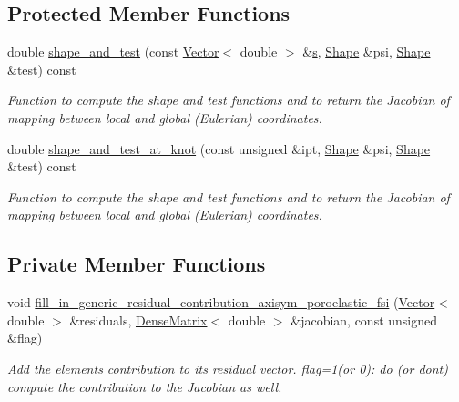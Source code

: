 \subsection*{Protected Member Functions}
\begin{DoxyCompactItemize}
\item 
double \hyperlink{classoomph_1_1LinearisedAxisymPoroelasticBJS__FSIElement_a7b0a7d3c7c5e8f98741ae725b4a03f04}{shape\+\_\+and\+\_\+test} (const \hyperlink{classoomph_1_1Vector}{Vector}$<$ double $>$ \&\hyperlink{cfortran_8h_ab7123126e4885ef647dd9c6e3807a21c}{s}, \hyperlink{classoomph_1_1Shape}{Shape} \&psi, \hyperlink{classoomph_1_1Shape}{Shape} \&test) const
\begin{DoxyCompactList}\small\item\em Function to compute the shape and test functions and to return the Jacobian of mapping between local and global (Eulerian) coordinates. \end{DoxyCompactList}\item 
double \hyperlink{classoomph_1_1LinearisedAxisymPoroelasticBJS__FSIElement_a9d3bcc9afdc79f09987164694d933b75}{shape\+\_\+and\+\_\+test\+\_\+at\+\_\+knot} (const unsigned \&ipt, \hyperlink{classoomph_1_1Shape}{Shape} \&psi, \hyperlink{classoomph_1_1Shape}{Shape} \&test) const
\begin{DoxyCompactList}\small\item\em Function to compute the shape and test functions and to return the Jacobian of mapping between local and global (Eulerian) coordinates. \end{DoxyCompactList}\end{DoxyCompactItemize}
\subsection*{Private Member Functions}
\begin{DoxyCompactItemize}
\item 
void \hyperlink{classoomph_1_1LinearisedAxisymPoroelasticBJS__FSIElement_a68c8de96b9f3034c9437e80036b2df1a}{fill\+\_\+in\+\_\+generic\+\_\+residual\+\_\+contribution\+\_\+axisym\+\_\+poroelastic\+\_\+fsi} (\hyperlink{classoomph_1_1Vector}{Vector}$<$ double $>$ \&residuals, \hyperlink{classoomph_1_1DenseMatrix}{Dense\+Matrix}$<$ double $>$ \&jacobian, const unsigned \&flag)
\begin{DoxyCompactList}\small\item\em Add the element\textquotesingle{}s contribution to its residual vector. flag=1(or 0)\+: do (or don\textquotesingle{}t) compute the contribution to the Jacobian as well. \end{DoxyCompactList}\end{DoxyCompactItemize}
